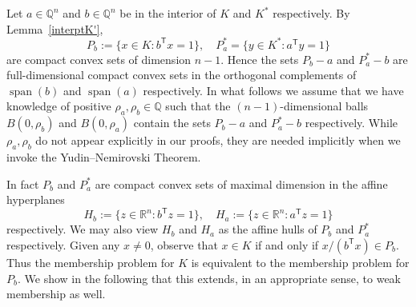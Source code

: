 \documentclass[11pt,reqno]{amsart}
\theoremstyle{definition}
\theoremstyle{remark}
\begin{document}
Let $a\in\mathbb{Q}^n$ and $b\in\mathbb{Q}^n$ be in the interior of $K$ and $K^*$ respectively. By Lemma~\ref{interptK'},
\begin{equation}\label{defPab}
P_b:=\{x\in K:b^\mathsf{T} x=1\}, \quad P^*_a=\{y\in K^*: a^\mathsf{T}y=1\}
\end{equation} 
are compact convex sets of dimension $n-1$.  Hence the sets $P_b-a$ and $P_a^*-b$
are full-dimensional compact convex sets in the orthogonal complements of $\operatorname{span}(b)$ and $\operatorname{span}(a)$ respectively.
In what follows we assume that we have knowledge of positive $\rho_a, \rho_b \in \mathbb{Q}$ such that the $(n-1)$-dimensional balls $B(0,\rho_b)$ and $B(0,\rho_a)$ 
contain  the sets $P_b-a$ and $P_a^*-b$ respectively. While $\rho_a, \rho_b$ do not appear explicitly in our proofs, they are needed implicitly when we invoke the Yudin--Nemirovski Theorem.

In fact $P_b$ and $P_a^*$ are compact convex sets of maximal dimension in the affine hyperplanes 
\[
H_b:=\{z\in\mathbb{R}^n: b^\mathsf{T} z=1\}, \quad  H_a:=\{z\in\mathbb{R}^n: a^\mathsf{T} z=1\}
\]
respectively. We may also view $H_b$ and $H_a$ as the affine hulls of $P_b$ and $P_a^*$ respectively. Given any $x\ne 0$, observe that $x\in K$ if and only if $x/(b^\mathsf{T} x) \in P_b$.
Thus the membership problem for $K$ is equivalent to the membership problem for $P_b$. We show in the following that this extends,  in an appropriate sense, to weak membership as well.
\end{document}
